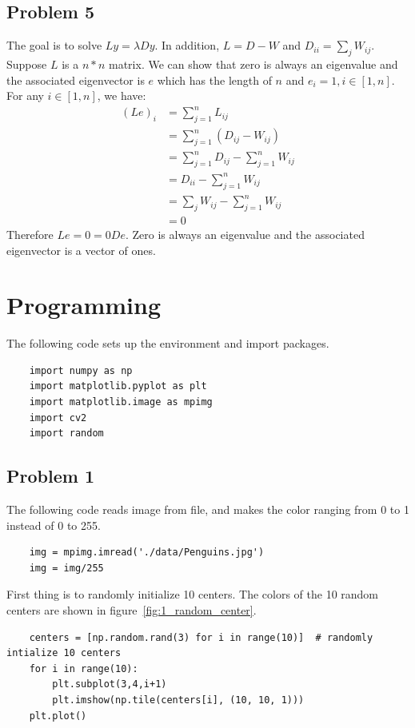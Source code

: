 \documentclass{article}
\begin{document}
\subsection*{Problem 5}
The goal is to solve $Ly=\lambda D y$. In addition, $L = D-W$ and $D_{ii} = \sum_{j} W_{ij}$. Suppose $L$ is a $n*n$ matrix. We can show that zero is always an eigenvalue and the associated eigenvector is $e$ which has the length of $n$ and $e_i = 1, i \in [1, n]$. For any $i \in [1,n]$, we have:
\begin{align*}
(Le)_i &= \sum^{n}_{j=1} L_{ij} \\
&= \sum^{n}_{j=1} (D_{ij} - W_{ij}) \\ 
&= \sum^{n}_{j=1} D_{ij} - \sum^{n}_{j=1}W_{ij} \\
&= D_{ii} - \sum^{n}_{j=1}W_{ij} \\
&= \sum_{j} W_{ij} - \sum^{n}_{j=1}W_{ij} \\
&= 0
\end{align*}
Therefore $Le =0 = 0De$. Zero is always an eigenvalue and the associated eigenvector is a vector of ones. 


\newpage
\section{Programming}
The following code sets up the environment and import packages.
\begin{lstlisting}
	import numpy as np
	import matplotlib.pyplot as plt
	import matplotlib.image as mpimg
	import cv2
	import random
\end{lstlisting}

\subsection*{Problem 1}
The following code reads image from file, and makes the color ranging from 0 to 1 instead of 0 to 255.  
\begin{lstlisting}
	img = mpimg.imread('./data/Penguins.jpg')
	img = img/255
\end{lstlisting}
First thing is to randomly initialize 10 centers. The colors of the 10 random centers are shown in figure~\ref{fig:1_random_center}.
\begin{lstlisting}
	centers = [np.random.rand(3) for i in range(10)]  # randomly intialize 10 centers
	for i in range(10):
		plt.subplot(3,4,i+1)
		plt.imshow(np.tile(centers[i], (10, 10, 1)))
	plt.plot()
\end{lstlisting}
\end{document}
